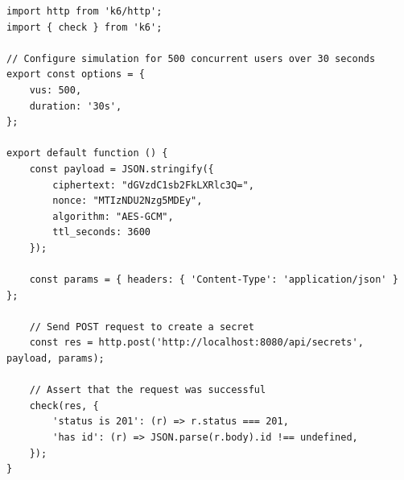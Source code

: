 \begin{lstlisting}[caption={Kịch bản mô phỏng tải (Load Test) tạo thông điệp bằng k6}, label={lst:k6_script}, showstringspaces=false, breaklines=true, basicstyle=\small\ttfamily]
import http from 'k6/http';
import { check } from 'k6';

// Configure simulation for 500 concurrent users over 30 seconds
export const options = {
    vus: 500,
    duration: '30s',
};

export default function () {
    const payload = JSON.stringify({
        ciphertext: "dGVzdC1sb2FkLXRlc3Q=",
        nonce: "MTIzNDU2Nzg5MDEy",
        algorithm: "AES-GCM",
        ttl_seconds: 3600
    });

    const params = { headers: { 'Content-Type': 'application/json' } };

    // Send POST request to create a secret
    const res = http.post('http://localhost:8080/api/secrets', payload, params);

    // Assert that the request was successful
    check(res, {
        'status is 201': (r) => r.status === 201,
        'has id': (r) => JSON.parse(r.body).id !== undefined,
    });
}
\end{lstlisting}